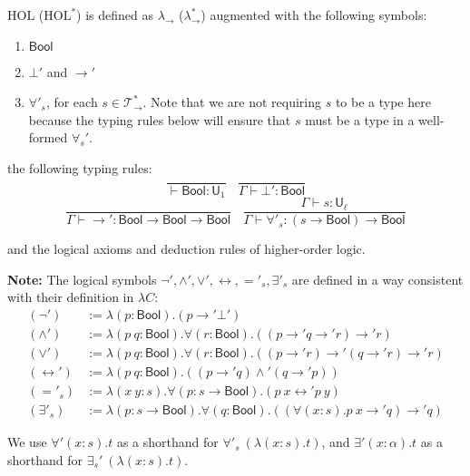   \begin{definition} $\text{HOL}$ ($\text{HOL}^*$) is defined as $\lambda_\to$ ($\lambda_\to^*$) augmented with the following symbols:
    \begin{enumerate}
      \item $\mathsf{Bool}$
      \item $\bot'$ and $\to'$
      \item $\forall'_s$, for each $s \in \mathcal{T}_\to^*$. Note that we are not requiring $s$ to be a type here
        because the typing rules below will ensure that $s$ must be a type in a well-formed $\forall_s'$.
    \end{enumerate}
    
    \noindent the following typing rules:
    $$\frac{}{\vdash \mathsf{Bool} : \mathsf{U}_1} \ \ \ \ \frac{}{\Gamma \vdash \bot' : \mathsf{Bool}}$$
    $$\frac{}{\Gamma \vdash \to' : \mathsf{Bool} \to \mathsf{Bool} \to \mathsf{Bool}} \ \ \ \
    \frac{\Gamma \vdash s : \mathsf{U}_\ell}{\Gamma \vdash \forall'_s : (s \to \mathsf{Bool}) \to \mathsf{Bool}}$$
    
    \noindent and the logical axioms and deduction rules of higher-order logic.

  \end{definition}
  
  \noindent \textbf{Note:} The logical symbols $\neg', \land', \lor', \leftrightarrow, ='_s, \exists'_s$ are defined in a way consistent
  with their definition in $\lambda C$:
  \begin{align*}
  (\neg') &:= \lambda (p : \mathsf{Bool}). (p \to' \bot') \\
  (\land') &:= \lambda (p \ q : \mathsf{Bool}). \forall (r : \mathsf{Bool}). ((p \to' q \to' r) \to' r) \\
  (\lor') &:= \lambda (p \ q : \mathsf{Bool}). \forall (r : \mathsf{Bool}). ((p \to' r) \to' (q \to' r) \to' r) \\
  (\leftrightarrow') &:= \lambda (p \ q : \mathsf{Bool}). ((p \to' q) \land' (q \to' p)) \\
  (='_s) &:= \lambda (x \ y : s). \forall (p : s \to \mathsf{Bool}). (p \ x \leftrightarrow' p \ y) \\
  (\exists'_s) &:= \lambda (p : s \to \mathsf{Bool}). \forall (q : \mathsf{Bool}). ((\forall (x : s). p \ x \to' q) \to' q)
  \end{align*}

  \noindent We use $\forall' (x : s). t$ as a shorthand for $\forall'_s \ (\lambda (x : s). t)$, and $\exists'(x : \alpha). t$
  as a shorthand for $\exists_s' \ (\lambda (x : s). t)$.

